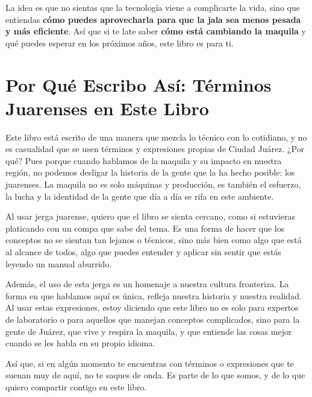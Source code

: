 La idea es que no sientas que la tecnología viene a complicarte la vida, sino que entiendas \textbf{cómo puedes aprovecharla para que la jala sea menos pesada y más eficiente}. Así que si te late saber \textbf{cómo está cambiando la maquila} y qué puedes esperar en los próximos años, este libro es para ti.

\section{Por Qué Escribo Así: Términos Juarenses en Este Libro}
Este libro está escrito de una manera que mezcla lo técnico con lo cotidiano, y no es casualidad que se usen términos y expresiones propias de Ciudad Juárez. ¿Por qué? Pues porque cuando hablamos de la maquila y su impacto en nuestra región, no podemos desligar la historia de la gente que la ha hecho posible: los juarenses. La maquila no es solo máquinas y producción, es también el esfuerzo, la lucha y la identidad de la gente que día a día se rifa en este ambiente.

Al usar jerga juarense, quiero que el libro se sienta cercano, como si estuvieras platicando con un compa que sabe del tema. Es una forma de hacer que los conceptos no se sientan tan lejanos o técnicos, sino más bien como algo que está al alcance de todos, algo que puedes entender y aplicar sin sentir que estás leyendo un manual aburrido.

Además, el uso de esta jerga es un homenaje a nuestra cultura fronteriza. La forma en que hablamos aquí es única, refleja nuestra historia y nuestra realidad. Al usar estas expresiones, estoy diciendo que este libro no es solo para expertos de laboratorio o para aquellos que manejan conceptos complicados, sino para la gente de Juárez, que vive y respira la maquila, y que entiende las cosas mejor cuando se les habla en su propio idioma.

Así que, si en algún momento te encuentras con términos o expresiones que te suenan muy de aquí, no te saques de onda. Es parte de lo que somos, y de lo que quiero compartir contigo en este libro.
